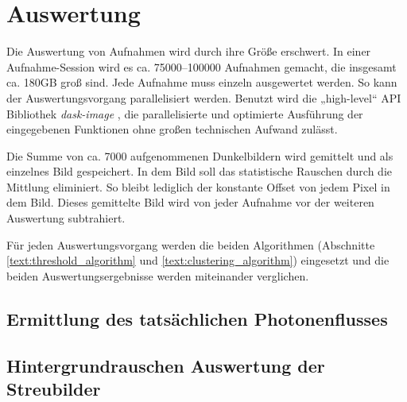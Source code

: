 \chapter{Auswertung}
\label{text:auswertung}
Die Auswertung von Aufnahmen wird durch ihre Größe erschwert. In einer Aufnahme-Session wird es ca. \numrange{75000}{100000} Aufnahmen gemacht, die insgesamt ca. 180GB groß sind. Jede Aufnahme muss einzeln ausgewertet werden. So kann der Auswertungsvorgang parallelisiert werden. Benutzt wird die „high-level“ API Bibliothek \textit{dask-image} \cite{dask-library}, die parallelisierte und optimierte Ausführung der eingegebenen Funktionen ohne großen technischen Aufwand zulässt.

\noindent
Die Summe von ca. 7000 aufgenommenen Dunkelbildern wird gemittelt und als einzelnes Bild gespeichert. In dem Bild soll das statistische Rauschen durch die Mittlung eliminiert. So bleibt lediglich der konstante Offset von jedem Pixel in dem Bild. Dieses gemittelte Bild wird von jeder Aufnahme vor der weiteren Auswertung subtrahiert.

\noindent
Für jeden Auswertungsvorgang werden die beiden Algorithmen (Abschnitte \ref{text:threshold_algorithm} und \ref{text:clustering_algorithm}) eingesetzt und die beiden Auswertungsergebnisse werden miteinander verglichen.

\section{Ermittlung des tatsächlichen Photonenflusses}
\label{text:butterfly_counting}


\section{Hintergrundrauschen Auswertung der Streubilder}
\label{text:streuung_counting}